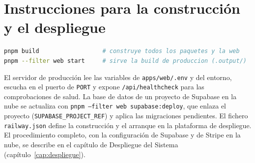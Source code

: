 \section{Instrucciones para la construcción y el despliegue}
\label{sec:dg-construccion}

\begin{lstlisting}[language=bash]
pnpm build                  # construye todos los paquetes y la web
pnpm --filter web start     # sirve la build de produccion (.output/)
\end{lstlisting}

El servidor de producción lee las variables de \texttt{apps/web/.env} y del
entorno, escucha en el puerto de \texttt{PORT} y expone
\texttt{/api/healthcheck} para las comprobaciones de salud. La base de datos de
un proyecto de Supabase en la nube se actualiza con
\texttt{pnpm --filter web supabase:deploy}, que enlaza el proyecto
(\texttt{SUPABASE\_PROJECT\_REF}) y aplica las migraciones pendientes. El
fichero \texttt{railway.json} define la construcción y el arranque en la
plataforma de despliegue. El procedimiento completo, con la configuración de
Supabase y de Stripe en la nube, se describe en el capítulo de Despliegue del
Sistema (capítulo~\ref{cap:despliegue}).

